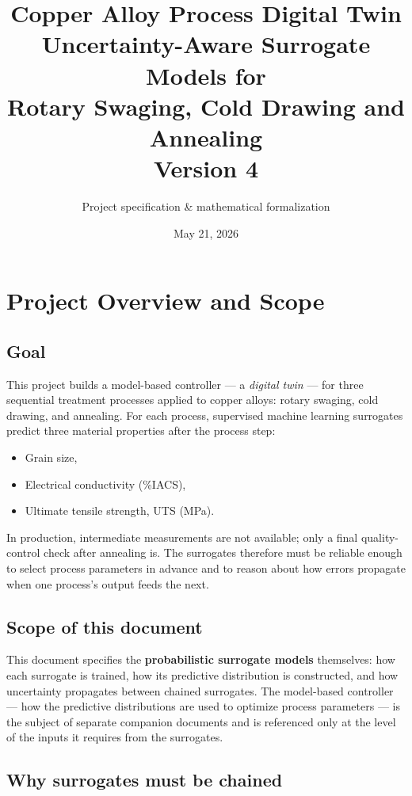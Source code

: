 \documentclass[11pt,a4paper]{article}
\title{\textbf{Copper Alloy Process Digital Twin}\\[0.4em]
\large Uncertainty-Aware Surrogate Models for\\Rotary Swaging, Cold Drawing and Annealing\\[0.4em]
\normalsize Version 4}
\author{Project specification \& mathematical formalization}
\date{May 21, 2026}
\begin{document}
\maketitle
\tableofcontents
\bigskip

\section{Project Overview and Scope}
\label{sec:overview}

\subsection{Goal}

This project builds a model-based controller --- a \emph{digital twin} --- for three sequential treatment processes applied to copper alloys: rotary swaging, cold drawing, and annealing. For each process, supervised machine learning surrogates predict three material properties after the process step:
\begin{itemize}
    \item Grain size,
    \item Electrical conductivity (\%IACS),
    \item Ultimate tensile strength, UTS (MPa).
\end{itemize}

In production, intermediate measurements are not available; only a final quality-control check after annealing is. The surrogates therefore must be reliable enough to select process parameters in advance and to reason about how errors propagate when one process's output feeds the next.

\subsection{Scope of this document}

This document specifies the \textbf{probabilistic surrogate models} themselves: how each surrogate is trained, how its predictive distribution is constructed, and how uncertainty propagates between chained surrogates. The model-based controller --- how the predictive distributions are used to optimize process parameters --- is the subject of separate companion documents and is referenced only at the level of the inputs it requires from the surrogates.

\subsection{Why surrogates must be chained}
\end{document}
